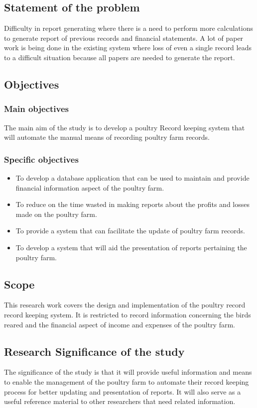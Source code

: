 \documentclass[12pt,]{article}
\begin{document}
\subsection{Statement of the problem}
Difficulty in report generating where there is a need to perform more calculations to generate report of previous records and financial statements. A lot of paper work is being done in the existing system where loss of even a  single record leads to a difficult situation because all papers are needed to generate the report.

\subsection{Objectives}
\subsubsection{Main objectives}
The main aim of the study is to develop a poultry Record keeping system that will automate the manual means of recording poultry farm records.


\subsubsection{Specific objectives}
\begin{itemize}
\item To develop a database application that can be used to maintain and provide financial information aspect of the poultry farm.
\item To reduce on the time wasted in making reports about the profits and losses made on the poultry farm.
\item To provide a system that can facilitate the update of poultry farm records.
\item To develop a system that will aid the presentation of reports pertaining the poultry farm.
\end{itemize}

\subsection{Scope}
This research work covers the design and implementation of the poultry record record keeping system. It is restricted to record information concerning the birds reared and the financial aspect of income and expenses of the poultry farm.
\subsection{Research Significance of the study}
The significance of the study is that it will provide useful information and means to enable the management of the poultry farm to automate their record keeping process for better updating and presentation of reports. It will also serve as a useful reference material to other researchers that need related information.
\end{document}
